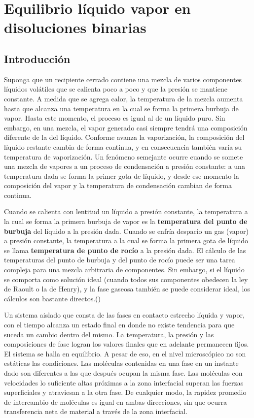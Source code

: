 \documentclass[11pt,letterpaper]{article}
\newcommand{\cita}[1]{(\cite{#1})}
\begin{document}
	
	\section{Equilibrio líquido vapor en disoluciones binarias}
	
	\subsection{Introducción}
	
	Suponga que un recipiente cerrado contiene una mezcla de varios componentes líquidos volátiles que se calienta poco a poco y que la presión se mantiene constante. A medida que se agrega calor, la temperatura de la mezcla aumenta hasta que alcanza una temperatura en la cual se forma la primera burbuja de vapor. Hasta este momento, el proceso es igual al de un líquido puro. Sin embargo, en una mezcla, el vapor generado casi siempre tendrá una composición diferente de la del líquido. Conforme avanza la vaporización, la composición del líquido restante cambia de forma continua, y en consecuencia también varía su temperatura de vaporización. Un fenómeno semejante ocurre cuando se somete una mezcla de vapores a un proceso de condensación a presión constante: a una temperatura dada se forma la primer gota de líquido, y desde ese momento la composición del vapor y la temperatura de condensación cambian de forma continua. 
	
	Cuando se calienta con lentitud un líquido a presión constante, la temperatura a la cual se forma la primera burbuja de vapor es la \textbf{temperatura del punto de burbuja} del líquido a la presión dada. Cuando se enfría despacio un gas (vapor) a presión constante, la temperatura a la cual se forma la primera gota de líquido se llama \textbf{temperatura de punto de rocío} a la presión dada. El cálculo de las temperaturas del punto de burbuja y del punto de rocío puede ser una tarea compleja para una mezcla arbitraria de componentes. Sin embargo, si el líquido se comporta como solución ideal (cuando todos sus componentes obedecen la ley de Raoult o la de Henry), y la fase gaseosa también se puede considerar ideal, los cálculos son bastante directos.\cita{felder}
	
	Un sistema aislado que consta de las fases en contacto estrecho líquida y vapor, con el tiempo alcanza un estado final en donde no existe tendencia para que suceda un cambio dentro del mismo. La temperatura, la presión y las composiciones de fase logran los valores finales que en adelante permanecen fijos. El sistema se halla en equilibrio. A pesar de eso, en el nivel microscópico no son estáticas las condiciones. Las moléculas contenidas en una fase en un instante dado son diferentes a las que después ocupan la misma fase. Las moléculas con velocidades lo suficiente altas próximas a la zona interfacial superan las fuerzas superficiales y atraviesan a la otra fase. De cualquier modo, la rapidez promedio de intercambio de moléculas es igual en ambas direcciones, sin que ocurra transferencia neta de material a través de la zona interfacial.
	
	
\end{document}
